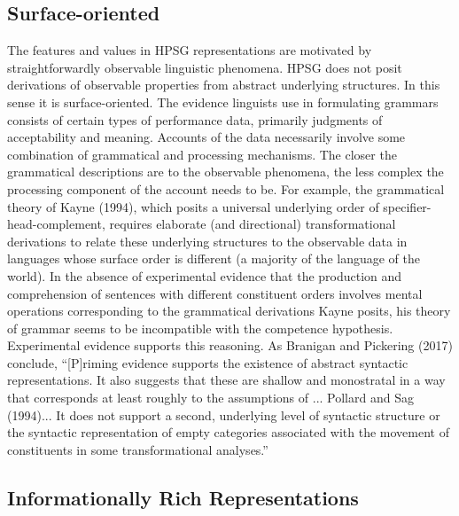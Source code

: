 \documentclass[a4paper]{article}
\begin{document}
\subsection{Surface-oriented}

The features and values in HPSG representations are motivated
by straightforwardly observable linguistic phenomena. HPSG does not posit derivations of observable properties from abstract underlying structures.  In this sense it is surface-oriented.
\newline
\newline
The evidence linguists use in formulating grammars consists of certain types of performance data, primarily judgments of acceptability and meaning.  Accounts of the data necessarily involve some combination of grammatical and processing mechanisms.  The closer the grammatical descriptions are to the observable phenomena, the less complex the processing component of the account needs to be.
\newline
\newline
For example, the grammatical theory of Kayne (1994), which posits a universal underlying order of specifier-head-complement, requires elaborate (and directional) transformational derivations to relate these underlying structures to the observable data in languages whose surface order is different (a majority of the language of the world).  In the absence of experimental evidence that the production and comprehension of sentences with different constituent orders involves mental operations corresponding to the grammatical derivations Kayne posits, his theory of grammar seems to be incompatible with the competence hypothesis.
\newline
\newline
Experimental evidence supports this reasoning.  As Branigan and Pickering (2017) conclude, ``[P]riming evidence supports the existence of
abstract syntactic representations. It also suggests that
these are shallow and monostratal in a way that corresponds
at least roughly to the assumptions of ... Pollard and
Sag (1994)... It does not support a second,
underlying level of syntactic structure or the syntactic representation
of empty categories associated with the movement
of constituents in some transformational analyses.''
\subsection{Informationally Rich Representations}
\end{document}
